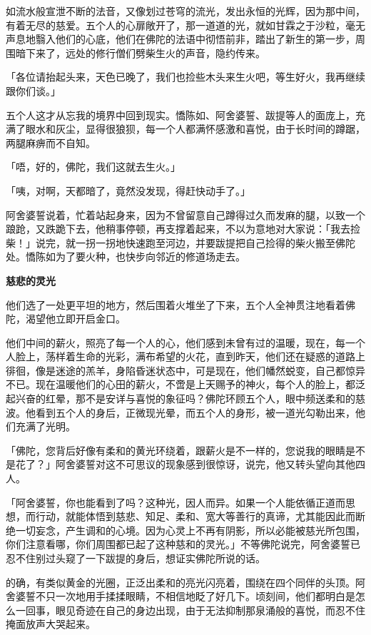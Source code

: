 \documentclass[twoside,openany]{book}
\newcommand{\mt}[1]{\textbullet \textbf{#1}}
\begin{document}
如流水般宣泄不断的法音，又像划过苍穹的流光，发出永恒的光辉，因为那中间，有着无尽的慈爱。五个人的心扉敞开了，那一道道的光，就如甘霖之于沙粒，毫无声息地翳入他们的心底，他们在佛陀的法语中彻悟前非，踏出了新生的第一步，周围暗下来了，远处的修行僧们劈柴生火的声音，隐约传来。

「各位请抬起头来，天色已晚了，我们也捡些木头来生火吧，等生好火，我再继续跟你们谈。」

五个人这才从忘我的境界中回到现实。憍陈如、阿舍婆誓、跋提等人的面庞上，充满了眼水和灰尘，显得很狼狈，每一个人都满怀感激和喜悦，由于长时间的蹲踞，两腿麻痹而不自知。

「唔，好的，佛陀，我们这就去生火。」

「咦，对啊，天都暗了，竟然没发现，得赶快动手了。」

阿舍婆誓说着，忙着站起身来，因为不曾留意自己蹲得过久而发麻的腿，以致一个踉跄，又跌跪下去，他稍事停顿，再支撑着起来，不以为意地对大家说：「我去捡柴！」说完，就一拐一拐地快速跑至河边，并要跋提把自己捡得的柴火搬至佛陀处。憍陈如为了要火种，也快步向邻近的修道场走去。

\mt{慈悲的灵光}

他们选了一处更平坦的地方，然后围着火堆坐了下来，五个人全神贯注地看着佛陀，渴望他立即开启金口。

他们中间的薪火，照亮了每一个人的心，他们感到未曾有过的温暖，现在，每一个人脸上，荡样着生命的光彩，满布希望的火花，直到昨天，他们还在疑惑的道路上徘徊，像是迷途的羔羊，身陷昏迷状态中，可是现在，他们幡然蜕变，自己都惊异不已。现在温暖他们的心田的薪火，不啻是上天赐予的神火，每个人的脸上，都泛起兴奋的红晕，那不是安详与喜悦的象征吗？佛陀环顾五个人，眼中频送柔和的慈波。他看到五个人的身后，正微现光晕，而五个人的身形，被一道光勾勒出来，他们充满了光明。

「佛陀，您背后好像有柔和的黄光环绕着，跟薪火是不一样的，您说我的眼睛是不是花了？」阿舍婆誓对这不可思议的现象感到很惊讶，说完，他又转头望向其他四人。

「阿舍婆誓，你也能看到了吗？这种光，因人而异。如果一个人能依循正道而思想，而行动，就能体悟到慈悲、知足、柔和、宽大等善行的真谛，尤其能因此而断绝一切妄念，产生调和的心境。因为心灵上不再有阴影，所以必能被慈光所包围，你们注意看哪，你们周围都已起了这种慈和的灵光。」不等佛陀说完，阿舍婆誓已忍不住别过头窥了一下跋提的身后，想证实佛陀所说的话。

的确，有类似黄金的光圈，正泛出柔和的亮光闪亮着，围绕在四个同伴的头顶。阿舍婆誓不只一次地用手揉揉眼睛，不相信地眨了好几下。顷刻间，他们都明白是怎么一回事，眼见奇迹在自己的身边出现，由于无法抑制那泉涌般的喜悦，而忍不住掩面放声大哭起来。
\end{document}
